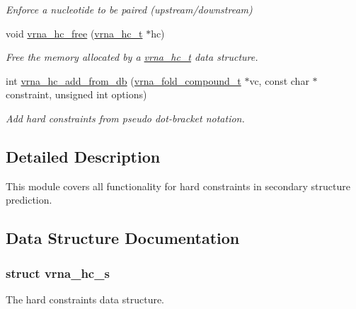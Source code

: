 \begin{DoxyCompactItemize}
\begin{DoxyCompactList}\small\item\em Enforce a nucleotide to be paired (upstream/downstream) \end{DoxyCompactList}\item 
void \hyperlink{group__hard__constraints_ga696dcf77887d856c6f21ea266d8b9ca2}{vrna\+\_\+hc\+\_\+free} (\hyperlink{group__hard__constraints_gac7e4c4f8abe3163a68110c5bff24e01d}{vrna\+\_\+hc\+\_\+t} $\ast$hc)
\begin{DoxyCompactList}\small\item\em Free the memory allocated by a \hyperlink{group__hard__constraints_gac7e4c4f8abe3163a68110c5bff24e01d}{vrna\+\_\+hc\+\_\+t} data structure. \end{DoxyCompactList}\item 
int \hyperlink{group__hard__constraints_ga5b4de3247b67358080c176b94591a8e6}{vrna\+\_\+hc\+\_\+add\+\_\+from\+\_\+db} (\hyperlink{group__fold__compound_ga1b0cef17fd40466cef5968eaeeff6166}{vrna\+\_\+fold\+\_\+compound\+\_\+t} $\ast$vc, const char $\ast$constraint, unsigned int options)
\begin{DoxyCompactList}\small\item\em Add hard constraints from pseudo dot-\/bracket notation. \end{DoxyCompactList}\end{DoxyCompactItemize}


\subsection{Detailed Description}
This module covers all functionality for hard constraints in secondary structure prediction. 



\subsection{Data Structure Documentation}
\label{structvrna__hc__s}
\subsubsection{struct vrna\+\_\+hc\+\_\+s}
The hard constraints data structure. 

